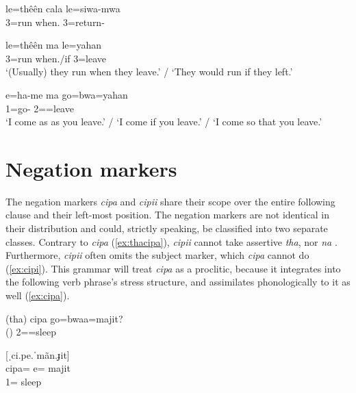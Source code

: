 \ea
\gll le=thêên cala le=siwa-mwa\\
 3=run when. 3=return-\\
\glt {}
\z

\ea
\gll le=thêên ma le=yahan\\
  3=run when./if 3=leave\\
\glt `(Usually) they run when they leave.' / `They would run if they left.'
\z


\ea
\gll e=ha-me ma go=bwa=yahan\\
 1=go-  2==leave\\
\glt `I come as as you leave.' / `I come if you leave.' / `I come so that you leave.'
%
%
%
%
%
\z




\section{Negation markers}

The negation markers \textit{cipa}  and \textit{cipii}  share their scope over the entire following clause and their left-most position. The negation markers are not identical in their distribution and could, strictly speaking, be classified into two separate classes. Contrary to \textit{cipa}  (\ref{ex:thacipa}), \textit{cipii}  cannot take assertive \textit{tha}, nor \textit{na} . Furthermore, \textit{cipii} often omits the subject marker, which \textit{cipa} cannot do (\ref{ex:cipi}). This grammar will treat \textit{cipa} as a proclitic, because it integrates into the following verb phrase's stress structure, and assimilates phonologically to it as well (\ref{ex:cipa}).
%

	
	\ea\label{ex:thacipa}
	\gll (tha) cipa {\ob}go=bwaa=majit{\cb}?\\
	 ()  2==sleep\\
	\glt {}
	\z
	
	
	\ea\label{ex:cipa}
	[ˌci.pe.ˈmãn.ɟit]\\
	\gll cipa= e= majit\\
	  1= sleep\\
	\glt {}
	\z
	
